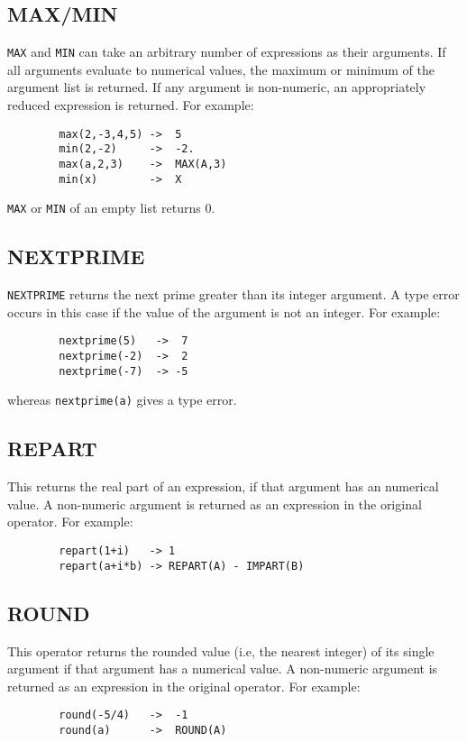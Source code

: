 \subsection{MAX/MIN}

{\tt MAX} and {\tt MIN}   can take an arbitrary
number of expressions as their arguments.  If all arguments evaluate to
numerical values, the maximum or minimum of the argument list is returned.
If any argument is non-numeric, an appropriately reduced expression is
returned.  For example:
\begin{verbatim}
        max(2,-3,4,5) ->  5
        min(2,-2)     ->  -2.
        max(a,2,3)    ->  MAX(A,3)
        min(x)        ->  X
\end{verbatim}
{\tt MAX} or {\tt MIN} of an empty list returns 0.

\subsection{NEXTPRIME} 

{\tt NEXTPRIME} returns the next prime greater than its integer argument.
A type error occurs in this case if the value of the argument is not an
integer. For example:
\begin{verbatim}
        nextprime(5)   ->  7
        nextprime(-2)  ->  2
        nextprime(-7)  -> -5
\end{verbatim}
whereas {\tt nextprime(a)} gives a type error.

\subsection{REPART} 
This returns the real part of an expression, if that argument has an
numerical value.  A non-numeric argument is returned as an expression in the
original operator.  For example:
\begin{verbatim}
        repart(1+i)   -> 1
        repart(a+i*b) -> REPART(A) - IMPART(B)
\end{verbatim}

\subsection{ROUND} 
This operator returns the rounded value (i.e, the nearest integer) of its
single argument if that argument has a numerical value.  A non-numeric
argument is returned as an expression in the original operator.  For
example:
\begin{verbatim}
        round(-5/4)   ->  -1
        round(a)      ->  ROUND(A)
\end{verbatim}

